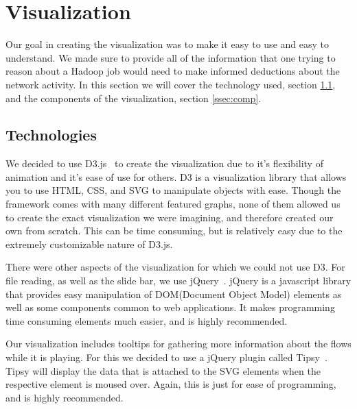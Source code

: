 \section{Visualization}
\label{sec:viz}
Our goal in creating the visualization was to make it easy to use and
easy to understand. We made sure to provide all of the information
that one trying to reason about a Hadoop job would need to make
informed deductions about the network activity. In this section we
will cover the technology used, section \ref{ssec:tech}, and the components of the
visualization, section \ref{ssec:comp}.

\subsection{Technologies}
\label{ssec:tech}
We decided to use D3.js~\cite{D3.js} to create the visualization due to
it's flexibility of animation and it's ease of use for others. D3 is a
visualization library that allows you to use HTML, CSS, and SVG to
manipulate objects with ease. Though the framework comes with many
different featured graphs, none of them allowed us to create the exact
visualization we were imagining, and therefore created our own from
scratch. This can be time consuming, but is relatively easy due to the
extremely customizable nature of D3.js.

There were other aspects of the visualization for which we could not
use D3. For file reading, as well as the slide bar, we use
jQuery~\cite{jQuery}. jQuery is a javascript library that provides
easy manipulation of DOM(Document Object Model) elements as well as
some components common to web applications. It makes programming time
consuming elements much easier, and is highly recommended.

Our visualization includes tooltips for gathering more information
about the flows while it is playing. For this we decided to use a
jQuery plugin called Tipsy~\cite{tipsy}. Tipsy will display the data
that is attached to the SVG elements when the respective element is
moused over. Again, this is just for ease of programming, and is
highly recommended.

